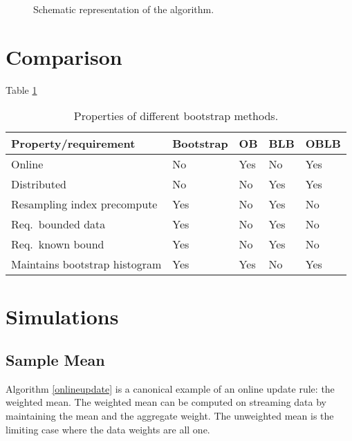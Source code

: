 \documentclass{article}
\begin{document}
\begin{sidewaysfigure}[tbp]
\caption{Schematic representation of the algorithm.}
\end{sidewaysfigure}


\section{Comparison}

Table \ref{bootcomp}

\begin{table}[h]
\caption{Properties of different bootstrap methods.}
\label{bootcomp}
\begin{tabular}{lllll}
\hline
\hline
Property/requirement & Bootstrap & OB & BLB & OBLB \\
\hline
Online & No & Yes & No & Yes \\ 
Distributed & No & No & Yes &  Yes \\ 
Resampling index precompute & Yes & No & Yes & No \\ 
Req.\ bounded data & Yes & No & Yes & No \\ 
Req.\ known bound & Yes & No & Yes & No \\ 
Maintains bootstrap histogram & Yes & Yes & No & Yes \\
\hline
\hline
\end{tabular}
\end{table}


\section{Simulations}

\subsection{Sample Mean}

Algorithm \ref{onlineupdate} is a canonical example of an online update rule: the weighted mean. 
The weighted mean can be computed on streaming data by maintaining the mean and the aggregate
weight. The unweighted mean is the limiting case where the data weights are all one.
\end{document}
